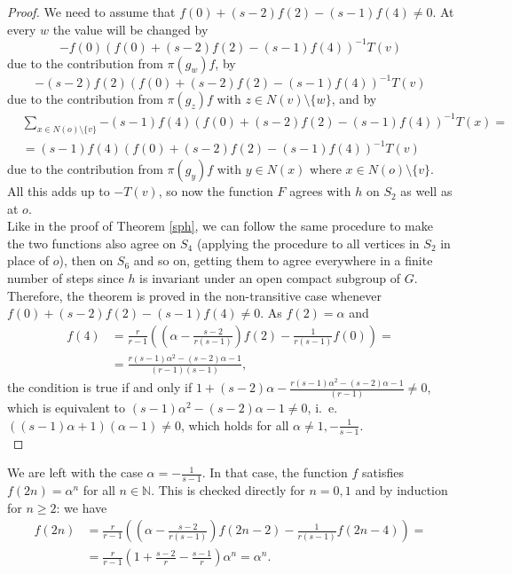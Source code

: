 \documentclass{article}
\theoremstyle{definition}
\theoremstyle{remark}
\theoremstyle{plain}
\begin{document}
\begin{proof}
We need to assume that $f(0)+(s-2)f(2)-(s-1)f(4)\neq 0$. At every $w$ the value will be changed by $$-f(0)(f(0)+(s-2)f(2)-(s-1)f(4))^{-1}T(v)$$ due to the contribution from $\pi(g_w)f$, by $$-(s-2)f(2)(f(0)+(s-2)f(2)-(s-1)f(4))^{-1}T(v)$$ due to the contribution from $\pi(g_z)f$ with $z\in N(v)\setminus\{w\}$, and by
\begin{align*}
&\sum_{x\in N(o)\setminus\{v\}}{-(s-1)f(4)(f(0)+(s-2)f(2)-(s-1)f(4))^{-1}T(x)}= \\[0.5em]
&=(s-1)f(4)(f(0)+(s-2)f(2)-(s-1)f(4))^{-1}T(v)
\end{align*} due to the contribution from $\pi(g_y)f$ with $y\in N(x)$ where $x\in N(o)\setminus\{v\}$. \\

All this adds up to $-T(v)$, so now the function $F$ agrees with $h$ on $S_2$ as well as at $o$. \\

Like in the proof of Theorem \ref{sph}, we can follow the same procedure to make the two functions also agree on $S_4$ (applying the procedure to all vertices in $S_2$ in place of $o$), then on $S_6$ and so on, getting them to agree everywhere in a finite number of steps since $h$ is invariant under an open compact subgroup of $G$. \\

Therefore, the theorem is proved in the non-transitive case whenever $f(0)+(s-2)f(2)-(s-1)f(4)\neq 0$. As $f(2)=\alpha$ and
\begin{align*}
f(4)&=\frac{r}
{r-1}\left(\left(\alpha-\frac{s-2}{r(s-1)}\right)f(2)-\frac{1}{r(s-1)}f(0)\right)= \\
&=\frac{r(s-1)\alpha^2-(s-2)\alpha-1}{(r-1)(s-1)},
\end{align*}
the condition is true if and only if $1+(s-2)\alpha-\frac{r(s-1)\alpha^2-(s-2)\alpha-1}{(r-1)}\neq 0$, which is equivalent to $(s-1)\alpha^2-(s-2)\alpha-1\neq 0$, i.~e.~$((s-1)\alpha+1)(\alpha-1)\neq 0$, which holds for all $\alpha\neq 1,-\frac{1}{s-1}$. \\
\end{proof}

We are left with the case $\alpha=-\frac{1}{s-1}$. In that case, the function $f$ satisfies $f(2n)=\alpha^n$ for all $n\in\mathbb{N}$. This is checked directly for $n=0,1$ and by induction for $n\geq 2$: we have
\begin{align*}
f(2n)&=\frac{r}
{r-1}\left(\left(\alpha-\frac{s-2}{r(s-1)}\right)f(2n-2)-\frac{1}{r(s-1)}f(2n-4)\right)= \\
&=\frac{r}{r-1}\left(1+\frac{s-2}{r}-\frac{s-1}{r}\right)\alpha^n=\alpha^n. \\
\end{align*}
\end{document}
